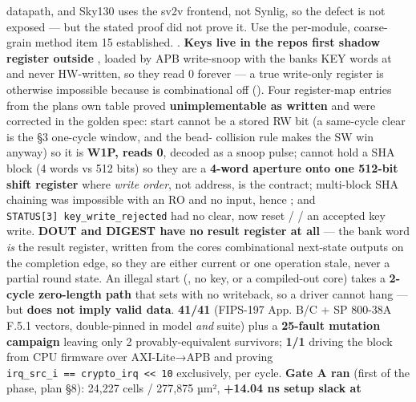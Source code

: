 \begin{record}
\begin{enumerate}
  datapath, and Sky130 uses the sv2v frontend, not Synlig, so the
    defect is not exposed --- but the stated
  proof did not prove it. Use the per-module, coarse-grain method item
  15 established. . \textbf{Keys live in the
  repo\textquotesingle s first shadow register outside
  }, loaded by APB write-snoop with the
  bank\textquotesingle s KEY words at  and never
  HW-written, so they read 0 forever --- a true write-only register is
  otherwise impossible because  is combinational off
   (). Four
  register-map entries from the plan\textquotesingle s own table proved
  \textbf{unimplementable as written} and were corrected in the golden
  spec:  start cannot be a stored RW bit (a same-cycle
   clear is the §3 one-cycle window, and the
  bead- collision rule makes the SW  win anyway) so
  it is \textbf{W1P, reads 0}, decoded as a snoop pulse; 
  cannot hold a SHA block (4 words vs 512 bits) so they are a
  \textbf{4-word aperture onto one 512-bit shift register} where
  \emph{write order}, not address, is the contract; multi-block SHA
  chaining was impossible with an RO  and no 
  input, hence ; and
  \texttt{STATUS[3]\ key\_\allowbreak{}write\_\allowbreak{}rejected} had
  no clear, now reset /  / an accepted key write.
  \textbf{DOUT and DIGEST have no result register at all} --- the bank
  word \emph{is} the result register, written from the
  cores\textquotesingle{} combinational next-state outputs on the
  completion edge, so they are either current or one operation stale,
  never a partial round state. An illegal start (, no key,
  or a compiled-out core) takes a \textbf{2-cycle zero-length path} that
  sets  with no writeback, so a  driver
  cannot hang --- but \textbf{ does not imply valid data}.
   \textbf{41/41} (FIPS-197 App. B/C + SP 800-38A
  F.5.1 vectors, double-pinned in model \emph{and} suite) plus a
  \textbf{25-fault mutation campaign} leaving only 2 provably-equivalent
  survivors;  \textbf{1/1} driving the block from
  CPU firmware over AXI-Lite→APB and proving
  \texttt{irq\_\allowbreak{}src\_\allowbreak{}i\ =\allowbreak{}=\allowbreak{}\ crypto\_\allowbreak{}irq\ <<\ 10}
  exclusively, per cycle. \ok{} \textbf{Gate A ran} (first of the phase,
  plan §8): 24,227 cells / 277,875 µm², \textbf{+14.04 ns setup slack at
}
\end{enumerate}
\end{record}
